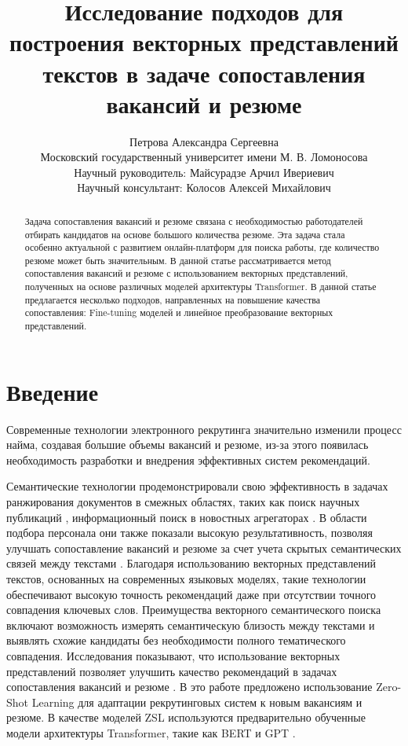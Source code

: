 \documentclass{article}
\title{ Исследование подходов для построения векторных представлений текстов в задаче сопоставления вакансий и резюме }
\author{ Петрова Александра Сергеевна \\
	Московский государственный университет имени М. В. Ломоносова\\
    Научный руководитель: Майсурадзе Арчил Ивериевич \\
    Научный консультант: Колосов Алексей Михайлович \\
    } \\
\date{}
\begin{document}
\maketitle

\begin{abstract}

Задача сопоставления вакансий и резюме связана с необходимостью работодателей отбирать кандидатов на основе большого количества резюме. Эта задача стала особенно актуальной с развитием онлайн-платформ для поиска работы, где количество резюме может быть значительным. В данной статье рассматривается метод сопоставления вакансий и резюме с использованием векторных представлений, полученных на основе различных моделей архитектуры Transformer. В данной статье предлагается несколько подходов, направленных на повышение качества сопоставления: Fine-tuning моделей и линейное преобразование векторных представлений.

\end{abstract}



\section{Введение}

Современные технологии электронного рекрутинга значительно изменили процесс найма, создавая большие объемы вакансий и резюме, из-за этого появилась необходимость разработки и внедрения эффективных систем рекомендаций. 

Семантические технологии продемонстрировали свою эффективность в задачах ранжирования документов в смежных областях, таких как поиск научных публикаций \citep{Latard_2017}, информационный поиск в новостных агрегаторах \citep{unknown}. В области подбора персонала они также показали высокую результативность, позволяя улучшать сопоставление вакансий и резюме за счет учета скрытых семантических связей между текстами \citep{inproceedings, 10100122, inbook, article}. Благодаря использованию векторных представлений текстов, основанных на современных языковых моделях, такие технологии обеспечивают высокую точность рекомендаций даже при отсутствии точного совпадения ключевых слов. Преимущества векторного семантического поиска включают возможность измерять семантическую близость между текстами и выявлять схожие кандидаты без необходимости полного тематического совпадения. Исследования показывают, что использование векторных представлений позволяет улучшить качество рекомендаций в задачах сопоставления вакансий и резюме \citep{kurek2024zero}. В это работе предложено использование Zero-Shot Learning для адаптации рекрутинговых систем к новым вакансиям и резюме. В качестве моделей ZSL используются предварительно обученные модели архитектуры Transformer, такие как BERT \citep{devlin2019bertpretrainingdeepbidirectional, reimers2019sentencebertsentenceembeddingsusing} и GPT \citep{yenduri2023generativepretrainedtransformercomprehensive}.
\end{document}
